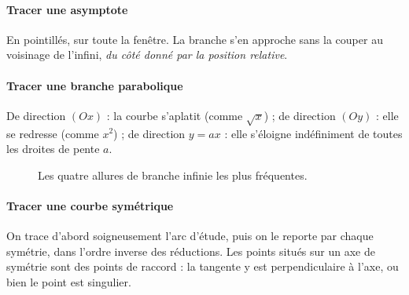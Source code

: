\documentclass[a4paper,11pt]{article}
\numberwithin{equation}{section}
\numberwithin{figure}{section}
\numberwithin{table}{section}
\theoremstyle{enonce}
\theoremstyle{exemple}
\theoremstyle{remarque}
\begin{document}
\paragraph{Tracer une asymptote} En pointillés, sur toute la fenêtre. La branche s'en approche sans la couper au voisinage de
l'infini, \emph{du côté donné par la position relative}.

\paragraph{Tracer une branche parabolique} De direction $(Ox)$ : la courbe s'aplatit (comme $\sqrt x$) ; de direction $(Oy)$ :
elle se redresse (comme $x^2$) ; de direction $y=ax$ : elle s'éloigne indéfiniment de toutes les droites de pente $a$.

\begin{figure}[H]
\centering
{}
\caption{Les quatre allures de branche infinie les plus fréquentes.}
\end{figure}

\paragraph{Tracer une courbe symétrique} On trace d'abord soigneusement l'arc d'étude, puis on le reporte par chaque
symétrie, dans l'ordre inverse des réductions. Les points situés sur un axe de symétrie sont des points de raccord : la
tangente y est perpendiculaire à l'axe, ou bien le point est singulier.
\end{document}
